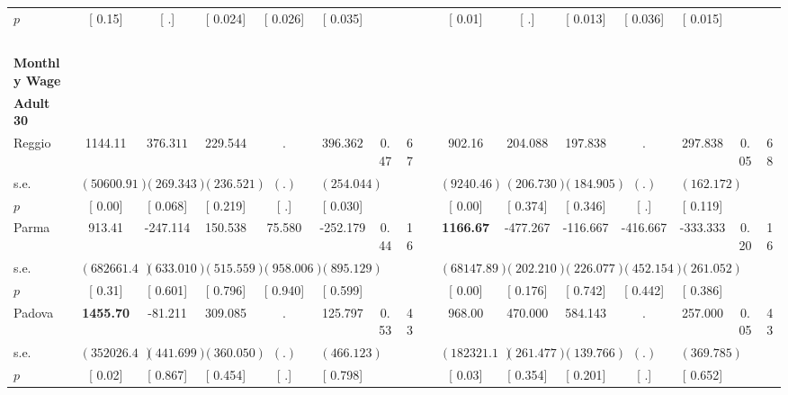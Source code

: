 \begin{longtable}{L{8em} c c c c c c c p{1em} c c c c c c c}
\quad \quad \quad \quad $ p$ & [     0.15] & [        .] & [    0.024] & [    0.026] & [    0.035] & & & & [     0.01] & [        .] & [    0.013] & [    0.036] & [    0.015] & &  \\[1em]
~\\[1em]
\textbf{Monthly Wage} \\*
\quad \quad \textbf{Adult 30} & & & & & & & & & & & & & & & \\* 
\quad \quad \quad Reggio& 1144.11 & $ \mathbf{  376.311}$ &   229.544 &         . & $ \mathbf{  396.362}$ &      0.47 &        67 & & 902.16 &   204.088 &   197.838 &         . &   297.838 &      0.05 &        68  \\*
\quad \quad \quad \quad s.e.& $ ( 50600.91)$ & $ (  269.343)$ & $ (  236.521)$ & $ (        .)$ & $ (  254.044)$ & & & & $ (  9240.46)$ & $ (  206.730)$ & $ (  184.905)$ & $ (        .)$ & $ (  162.172)$ & &  \\*
\quad \quad \quad \quad $ p$ & [     0.00] & [    0.068] & [    0.219] & [        .] & [    0.030] & & & & [     0.00] & [    0.374] & [    0.346] & [        .] & [    0.119] & &  \\[1em]
\quad \quad \quad Parma& 913.41 &  -247.114 &   150.538 &    75.580 &  -252.179 &      0.44 &        16 & & \textbf{  1166.67} &  -477.267 &  -116.667 &  -416.667 &  -333.333 &      0.20 &        16  \\*
\quad \quad \quad \quad s.e.& $ (682661.49)$ & $ (  633.010)$ & $ (  515.559)$ & $ (  958.006)$ & $ (  895.129)$ & & & & $ ( 68147.89)$ & $ (  202.210)$ & $ (  226.077)$ & $ (  452.154)$ & $ (  261.052)$ & &  \\*
\quad \quad \quad \quad $ p$ & [     0.31] & [    0.601] & [    0.796] & [    0.940] & [    0.599] & & & & [     0.00] & [    0.176] & [    0.742] & [    0.442] & [    0.386] & &  \\[1em]
\quad \quad \quad Padova& \textbf{  1455.70} &   -81.211 &   309.085 &         . &   125.797 &      0.53 &        43 & & 968.00 &   470.000 &   584.143 &         . &   257.000 &      0.05 &        43  \\*
\quad \quad \quad \quad s.e.& $ (352026.45)$ & $ (  441.699)$ & $ (  360.050)$ & $ (        .)$ & $ (  466.123)$ & & & & $ (182321.19)$ & $ (  261.477)$ & $ (  139.766)$ & $ (        .)$ & $ (  369.785)$ & &  \\*
\quad \quad \quad \quad $ p$ & [     0.02] & [    0.867] & [    0.454] & [        .] & [    0.798] & & & & [     0.03] & [    0.354] & [    0.201] & [        .] & [    0.652] & &  \\[1em]

\end{longtable}
